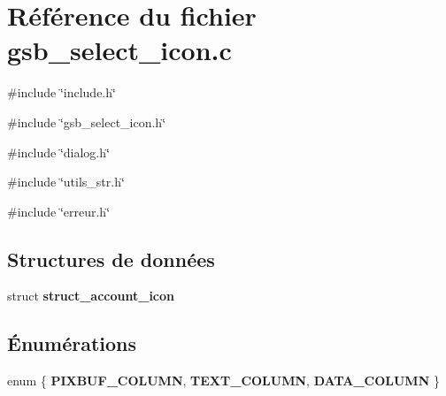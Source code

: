 \section{Référence du fichier gsb\_\-select\_\-icon.c}
\label{gsb__select__icon_8c}
{\ttfamily \#include \char`\"{}include.h\char`\"{}}\par
{\ttfamily \#include \char`\"{}gsb\_\-select\_\-icon.h\char`\"{}}\par
{\ttfamily \#include \char`\"{}dialog.h\char`\"{}}\par
{\ttfamily \#include \char`\"{}utils\_\-str.h\char`\"{}}\par
{\ttfamily \#include \char`\"{}erreur.h\char`\"{}}\par
\subsection*{Structures de données}
\begin{DoxyCompactItemize}
\item 
struct {\bf struct\_\-account\_\-icon}
\end{DoxyCompactItemize}
\subsection*{Énumérations}
\begin{DoxyCompactItemize}
\item 
enum \{ {\bf PIXBUF\_\-COLUMN}, 
{\bf TEXT\_\-COLUMN}, 
{\bf DATA\_\-COLUMN}
 \}
\end{DoxyCompactItemize}
